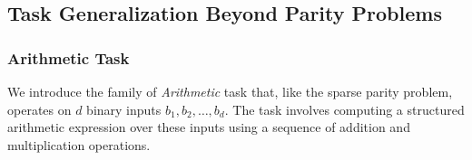 


\subsection{Task Generalization Beyond Parity Problems}





\subsubsection{Arithmetic Task}\label{subsec:arithmetic}











We introduce the family of \textit{Arithmetic} task that, like the sparse parity problem, operates on 
\( d \) binary inputs \( b_1, b_2, \dots, b_d \). The task involves computing a structured arithmetic expression over these inputs using a sequence of addition and multiplication operations.
\newcommand{\op}{\textrm{op}}

